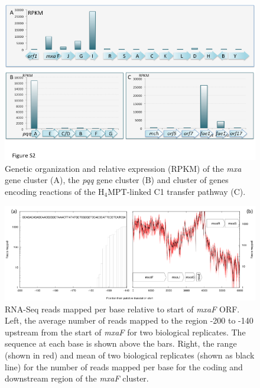 \begin{figure}[H]
\centering
     \includegraphics[width=1.0\textwidth]{./tex/chapter1/figures/supplemental/FigureS2.png}
     \begin{singlespace}
     \caption[Genetic organization and relative expression (RPKM) of the \textit{mxa} gene cluster.]{
        Genetic organization and relative expression (RPKM) of the \textit{mxa} gene cluster (A), the \textit{pqq} gene cluster (B) and cluster of genes encoding reactions of the H$_4$MPT-linked C1 transfer pathway (C).}
     \label{fig:S2} %
     \end{singlespace}
\end{figure}

\begin{figure}[H]
\centering
     \includegraphics[width=1.0\textwidth]{./tex/chapter1/figures/supplemental/FigureS3.png}
     \begin{singlespace}
     \caption[RNA-Seq reads mapped per base relative to start of \textit{mxaF} ORF]{
        RNA-Seq reads mapped per base relative to start of \textit{mxaF} ORF.
        Left, the average number of reads mapped to the region -200 to -140 upstream from the start of \textit{mxaF} for two biological replicates.
        The sequence at each base is shown above the bars.
        Right, the range (shown in red) and mean of two biological replicates (shown as black line) for the number of reads mapped per base for the coding and downstream region of the \textit{mxaF} cluster.
        }
     \label{fig:S3} %
     \end{singlespace}
\end{figure}

